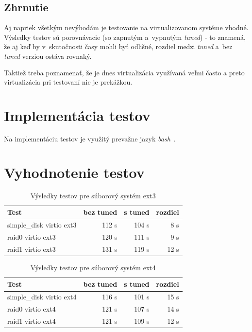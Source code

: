 \subsection{Zhrnutie}

Aj napriek všetkým nevýhodám je testovanie na virtualizovanom systéme vhodné.
Výsledky testov sú porovnávacie (so zapnutým a~vypnutým \emph{tuned}) - to
znamená, že aj keď by v~skutočnosti časy mohli byť odlišné, rozdiel medzi
\emph{tuned} a~bez \emph{tuned} verziou ostáva rovnaký.

Taktiež treba poznamenať, že je dnes virtualizácia využívaná veľmi často a
preto virtualizácia pri testovaní nie je prekážkou.

%
%

\section{Implementácia testov}

Na implementáciu testov je využitý prevažne jazyk \emph{bash}~\cite{bash}. 

%
%

\section{Vyhodnotenie testov}

%
%
\begin{table}[H]
\begin{center}
\begin{tabular}{|l|r|r|r|}
    \hline
    \textbf{Test} & \textbf{bez tuned} & \textbf{s tuned} & \textbf{rozdiel} \\ \hline
    simple\_disk virtio ext3 & 112 s & 104 s & 8 s \\
    \hline
    raid0 virtio ext3 & 120 s & 111 s & 9 s \\
    \hline
    raid1 virtio ext3 & 131 s & 119 s & 12 s \\
    \hline
\end{tabular}
\caption{Výsledky testov pre súborový systém ext3}
\label{tab:results-ext3}
\end{center}
\end{table}

\begin{table}[H]
\begin{center}
\begin{tabular}{|l|r|r|r|}
    \hline
    \textbf{Test} & \textbf{bez tuned} & \textbf{s tuned} & \textbf{rozdiel} \\ \hline
    simple\_disk virtio ext4 & 116 s & 101 s & 15 s \\
    \hline
    raid0 virtio ext4 & 121 s & 107 s & 14 s \\
    \hline
    raid1 virtio ext4 & 121 s & 109 s & 12 s \\
    \hline
\end{tabular}
\caption{Výsledky testov pre súborový systém ext4}
\label{tab:results-ext4}
\end{center}
\end{table}

